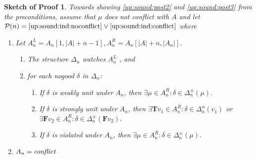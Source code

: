 \documentclass{vutinfth} %
\newtheorem{proof-sketch}{Sketch of Proof}[chapter]
\newcommand{\ass}{A}
\newcommand{\bT}{\mathbf{T}}
\newcommand{\bF}{\mathbf{F}}
\newcommand{\sgl}{\mu}
\begin{document}
\begin{proof-sketch}
Towards showing \ref{up:sound:post2} and \ref{up:sound:post3} from the preconditions, assume that $\sgl$ does not conflict with $\ass$ and let $\mathcal{P}(n) = \textrm{\ref{up:sound:ind:noconflict}} \vee \textrm{\ref{up:sound:ind:conflict}}$ where

\begin{enumerate}[label=(\Roman*)]
	\item Let $\ass_n^L = \ass_n[1, |A| + n - 1], \ass_n^R = \ass_n[|A| + n, |\ass_n|]$. \label{up:sound:ind:noconflict}
	    \begin{enumerate}[label=(\alph*),ref=\theenumi(\alph*)]
	     \item The structure $\Delta_n$ watches $\ass^L_n$ \label{up:sound:ind:watches}, and
	     \item for each nogood $\delta$ in $\Delta_n$:\label{up:sound:ind:lr}
		\begin{enumerate}[label=(\roman*),ref=\theenumii(\roman*)]
			\item If $\delta$ is weakly unit under $\ass_n$, then $\exists \sgl \in A_n^R : \delta \in \Delta_n^\pm(\sgl)$. \label{up:sound:ind:wu}
			\item If $\delta$ is strongly unit under $\ass_n$, then $\exists {\bT v_1} \in A_n^R : \delta \in \Delta_n^\alpha(v_1)$ or $\exists {\bF v_2} \in A_n^R : \delta \in \Delta_n^\pm({\bF v_2})$. \label{up:sound:ind:su}
			\item If $\delta$ is violated under $\ass_n$, then $\exists \sgl \in A_n^R : \delta \in \Delta_n^\pm(\sgl)$. \label{up:sound:ind:vio}
		\end{enumerate}
	\end{enumerate}
	\item $\ass_n = \emph{conflict}$ \label{up:sound:ind:conflict}
\end{enumerate}


\end{proof-sketch}
\end{document}

